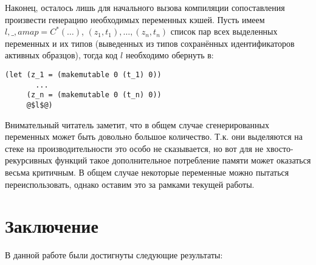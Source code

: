 Наконец, осталось лишь для начального вызова компиляции сопоставления произвести генерацию необходимых переменных кэшей. Пусть имеем $l,\_,amap=C^*(\ldots)$, $(z_1, t_1),\ldots,(z_n, t_n)$ список пар всех выделенных переменных и их типов (выведенных из типов сохранённых идентификаторов активных образцов), тогда код $l$ необходимо обернуть в:

\noindent
\begin{minipage}{\linewidth}
\begin{lstlisting}[language=lambda,escapechar=@] 
(let (z_1 = (makemutable 0 (t_1) 0))
       ...
     (z_n = (makemutable 0 (t_n) 0))
     @$l$@)
\end{lstlisting}
\end{minipage}

Внимательный читатель заметит, что в общем случае сгенерированных переменных может быть довольно большое количество. Т.к. они выделяются на стеке на производительности это особо не сказывается, но вот для не хвосто-рекурсивных функций такое дополнительное потребление памяти может оказаться весьма критичным. В общем случае некоторые переменные можно пытаться переиспользовать, однако оставим это за рамками текущей работы.

\section{Заключение}

\noindent В данной работе были достигнуты следующие результаты:

